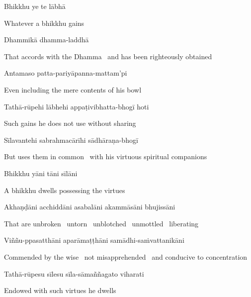 Bhikkhu ye te lābhā

\begin{english}
  Whatever a bhikkhu gains
\end{english}

Dhammikā dhamma-laddhā

\begin{english}
  That accords with the Dhamma \breathmark\ and has been righteously obtained
\end{english}

Antamaso patta-pariyāpanna-mattam'pi

\begin{english}
  Even including the mere contents of his bowl
\end{english}

Tathā-rūpehi lābhehi appaṭivibhatta-bhogī hoti

\begin{english}
  Such gains he does not use without sharing
\end{english}

Sīlavantehi sabrahmacārīhi sādhāraṇa-bhogī

\begin{english}
  But uses them in common \breathmark\ with his virtuous spiritual companions
\end{english}

Bhikkhu yāni tāni sīlāni

\begin{english}
  A bhikkhu dwells possessing the virtues
\end{english}

Akhaṇḍāni acchiddāni asabalāni akammāsāni bhujissāni

\begin{english}
  That are unbroken \breathmark\ untorn \breathmark\ unblotched \breathmark\ unmottled \breathmark\ liberating
\end{english}

Viññu-ppasatthāni aparāmaṭṭhāni samādhi-saṁvattanikāni

\begin{english-hang}
  Commended by the wise \breathmark\ not misapprehended \breathmark\ and conducive to concentration
\end{english-hang}

Tathā-rūpesu sīlesu sīla-sāmaññagato viharati

\begin{english}
  Endowed with such virtues he dwells
\end{english}

